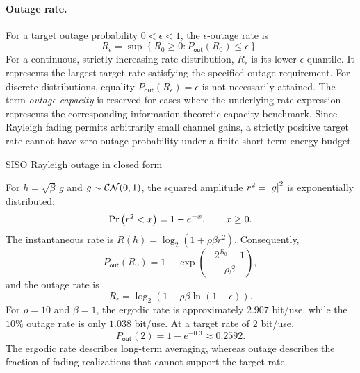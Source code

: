 \paragraph{Outage rate.}
For a target outage probability $0<\epsilon<1$, the $\epsilon$-outage rate is
\begin{equation}\label{eq:outagerate}
	\boxed{
		R_\epsilon
		=\sup\left\{
		R_0\geq0:
		P_{\mathsf{out}}(R_0)\leq\epsilon
		\right\}.
	}
\end{equation}
For a continuous, strictly increasing rate distribution, $R_\epsilon$ is its lower $\epsilon$-quantile. It represents the largest target rate satisfying the specified outage requirement. For discrete distributions, equality
$P_{\mathsf{out}}(R_\epsilon)=\epsilon$
is not necessarily attained. The term
\emph{outage capacity} is reserved for cases where
the underlying rate expression represents the
corresponding information-theoretic capacity benchmark.
%
Since Rayleigh fading permits arbitrarily small
channel gains, a strictly positive target rate
cannot have zero outage probability under a
finite short-term energy budget.

\begin{example}{SISO Rayleigh outage in closed form}
	\label{ex:sisoout}
	
	For $h=\sqrt{\beta}\,g$ and $g\sim\mathcal{CN}(0,1)$,
	the squared amplitude $r^2=\left|g\right|^2$ is
	exponentially distributed:
	\begin{equation*}
		\Pr\left(r^2<x\right)=1-e^{-x},
		\qquad x\geq0.
	\end{equation*}
	The instantaneous rate is
	$R(h)=\log_2(1+\rho\beta r^2)$.
	Consequently,
	\begin{equation}\label{eq:sisoout}
		\boxed{
			P_{\mathsf{out}}(R_0)
			=1-\exp\left(
			-\frac{2^{R_0}-1}{\rho\beta}
			\right),
		}
	\end{equation}
	and the outage rate is
	\begin{equation*}
		\boxed{
			R_\epsilon
			=\log_2\left(
			1-\rho\beta\ln(1-\epsilon)
			\right).
		}
	\end{equation*}
%	
	For $\rho=10$ and $\beta=1$, the ergodic rate is
	approximately $2.907$ bit/use, while the
	$10\%$ outage rate is only $1.038$ bit/use.
	At a target rate of $2$ bit/use,
	\begin{equation*}
		P_{\mathsf{out}}(2)
		=1-e^{-0.3}\approx0.2592.
	\end{equation*}
	The ergodic rate describes long-term averaging,
	whereas outage describes the fraction of fading
	realizations that cannot support the target rate.
\end{example}

